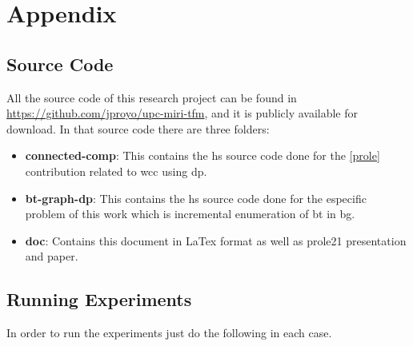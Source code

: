 \chapter{Appendix}
\section{Source Code}
All the source code of this research project can be found in \url{https://github.com/jproyo/upc-miri-tfm}, and it is publicly available for download.
In that source code there are three folders:

\begin{itemize}
  \item \textbf{connected-comp}: This contains the \acrshort{hs} source code done for the \autoref{prole} contribution related to \acrfull{wcc} using \acrshort{dp}.
  \item \textbf{bt-graph-dp}: This contains the \acrshort{hs} source code done for the especific problem of this work which is incremental enumeration of \acrlong{bt} in \acrlong{bg}.
  \item \textbf{doc}: Contains this document in LaTex format as well as \acrshort{prole21} presentation and paper.
\end{itemize}

\section{Running Experiments}
In order to run the experiments just do the following in each case.

